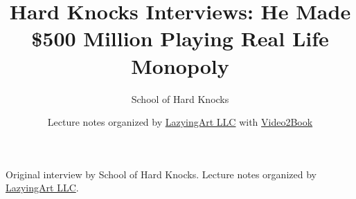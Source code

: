 \documentclass[11pt,oneside]{book}
\begin{document}
\frontmatter
\title{Hard Knocks Interviews: He Made \$500 Million Playing Real Life Monopoly}
\author{School of Hard Knocks}
\date{Lecture notes organized by \href{https://lazying.art}{LazyingArt LLC} with \href{https://github.com/lachlanchen/Video2Book}{Video2Book}}
\maketitle
\begin{center}
\small Original interview by School of Hard Knocks. Lecture notes organized by \href{https://lazying.art}{LazyingArt LLC}.
\end{center}
\clearpage
\mainmatter

\end{document}
